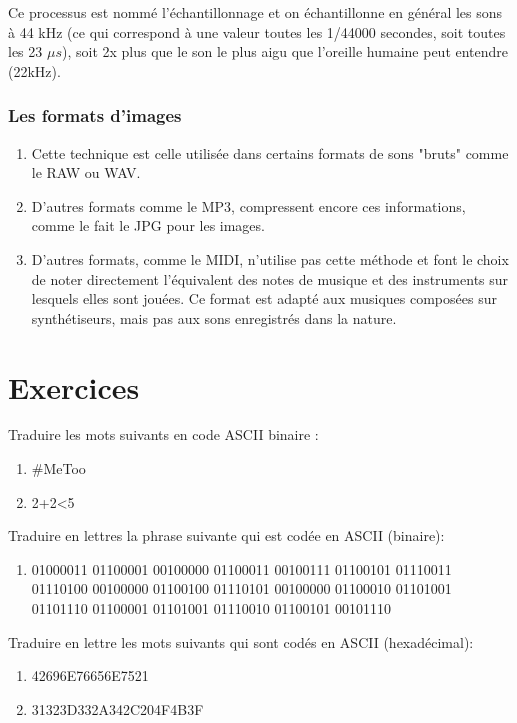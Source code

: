 \documentclass[11pt, a4paper]{book}
\begin{document}
Ce processus est nommé l'échantillonnage et on échantillonne en général les sons à 44 kHz (ce qui correspond à une valeur toutes les 1/44000 secondes, soit toutes les 23 $\mu s$), soit 2x plus que le son le plus aigu que l'oreille humaine peut entendre (22kHz).

\subsubsection{Les formats d'images}
\begin{enumerate}
\item Cette technique est celle utilisée dans certains formats de sons "bruts" comme le RAW ou WAV. 

\item D'autres formats comme le MP3, compressent encore ces informations, comme le fait le JPG pour les images.

\item D'autres formats, comme le MIDI, n'utilise pas cette méthode et font le choix de noter directement l'équivalent des notes de musique et des instruments sur lesquels elles sont jouées. Ce format est adapté aux musiques composées sur synthétiseurs, mais pas aux sons enregistrés dans la nature.

\end{enumerate}

\section{Exercices}
\begin{exercice}
Traduire les mots suivants en code ASCII binaire :
\begin{enumerate}
\item \#MeToo
\item 2+2<5
\end{enumerate}
\end{exercice}


\begin{exercice}
Traduire en lettres la phrase suivante qui est codée en ASCII (binaire):
\begin{enumerate}
\item 01000011 01100001 00100000 01100011 00100111 01100101 01110011 01110100 00100000 01100100 01110101 00100000 01100010 01101001 01101110 01100001 01101001 01110010 01100101 00101110
\end{enumerate}
\end{exercice}

\begin{exercice}
Traduire en lettre les mots suivants qui sont codés en ASCII (hexadécimal):
\begin{enumerate}
\item 42696E76656E7521
\item 31323D332A342C204F4B3F
\end{enumerate}
\end{exercice}
\end{document}
